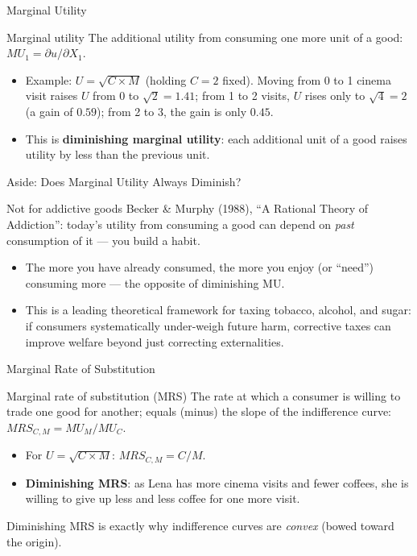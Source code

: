 \documentclass[11pt,aspectratio=169]{beamer}
\begin{document}
\begin{frame}{Marginal Utility}
  \begin{block}{Marginal utility}
    The additional utility from consuming one more unit of a good: $MU_1 = \partial u / \partial X_1$.
  \end{block}
  \begin{itemize}
    \item Example: $U = \sqrt{C \times M}$ (holding $C=2$ fixed). Moving from 0 to 1 cinema visit raises $U$ from 0 to $\sqrt{2}=1.41$; from 1 to 2 visits, $U$ rises only to $\sqrt{4}=2$ (a gain of $0.59$); from 2 to 3, the gain is only $0.45$.
    \item This is \textbf{diminishing marginal utility}: each additional unit of a good raises utility by less than the previous unit.
  \end{itemize}
\end{frame}

\begin{frame}{Aside: Does Marginal Utility Always Diminish?}
  \begin{alertblock}{Not for addictive goods}
    Becker \& Murphy (1988), ``A Rational Theory of Addiction'': today's utility from consuming a good can depend on \emph{past} consumption of it --- you build a habit.
  \end{alertblock}
  \begin{itemize}
    \item The more you have already consumed, the more you enjoy (or ``need'') consuming more --- the opposite of diminishing MU.
    \item This is a leading theoretical framework for taxing tobacco, alcohol, and sugar: if consumers systematically under-weigh future harm, corrective taxes can improve welfare beyond just correcting externalities.
  \end{itemize}
\end{frame}

\begin{frame}{Marginal Rate of Substitution}
  \begin{block}{Marginal rate of substitution (MRS)}
    The rate at which a consumer is willing to trade one good for another; equals (minus) the slope of the indifference curve: $MRS_{C,M} = MU_M / MU_C$.
  \end{block}
  \begin{itemize}
    \item For $U=\sqrt{C \times M}$: $MRS_{C,M} = C/M$.
    \item \textbf{Diminishing MRS}: as Lena has more cinema visits and fewer coffees, she is willing to give up less and less coffee for one more visit.
  \end{itemize}
  \vspace{0.3em}
  \centering
  Diminishing MRS is exactly why indifference curves are \emph{convex} (bowed toward the origin).
\end{frame}
\end{document}
